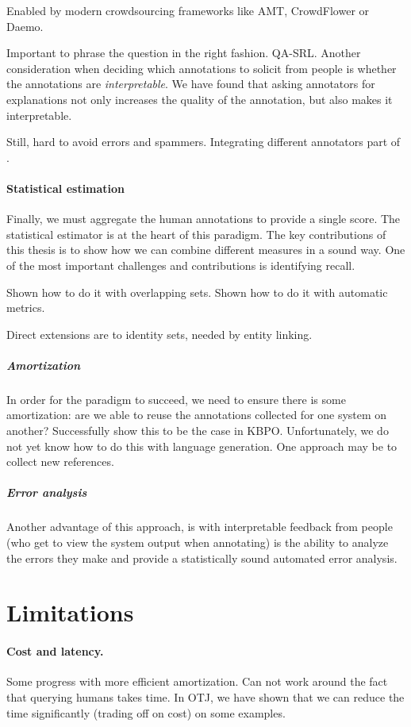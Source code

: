 Enabled by modern crowdsourcing frameworks like AMT, CrowdFlower or Daemo.

Important to phrase the question in the right fashion.
QA-SRL.
Another consideration when deciding which annotations to solicit from people is whether the annotations are \textit{interpretable}.
We have found that asking annotators for explanations not only increases the quality of the annotation, but also makes it interpretable.

Still, hard to avoid errors and spammers.
Integrating different annotators part of .


\paragraph{Statistical estimation}
Finally, we must aggregate the human annotations to provide a single score. 
The statistical estimator is at the heart of this paradigm.
The key contributions of this thesis is to show how we can combine different measures in a sound way.
One of the most important challenges and contributions is identifying recall.

Shown how to do it with overlapping sets.
Shown how to do it with automatic metrics.

Direct extensions are to identity sets, needed by entity linking.

\subparagraph{Amortization}

In order for the paradigm to succeed, we need to ensure there is some amortization: are we able to reuse the annotations collected for one system on another?
Successfully show this to be the case in KBPO\@.
Unfortunately, we do not yet know how to do this with language generation. One approach may be to collect new references.

\subparagraph{Error analysis}

Another advantage of this approach, is with interpretable feedback from people (who get to view the system output when annotating) is the ability to analyze the errors they make and provide a statistically sound automated error analysis.


\section{Limitations}

\paragraph{Cost and latency.}
Some progress with more efficient amortization.
Can not work around the fact that querying humans takes time. In OTJ, we have shown that we can reduce the time significantly (trading off on cost) on some examples.

